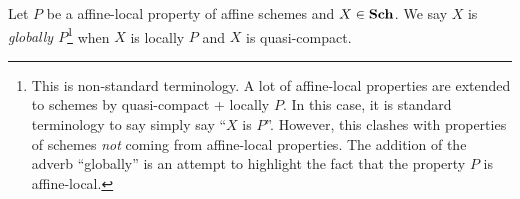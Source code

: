 \documentclass[../main.tex]{subfiles}
\begin{document}
\begin{dfn}[Globally]
  
  Let $P$ be a affine-local property of affine schemes and 
  $X \in \mathbf{Sch}$.
  We say $X$ is \emph{globally $P$}\footnote{
    This is non-standard terminology.
    A lot of affine-local properties are extended to schemes by 
    quasi-compact + locally $P$.
    In this case, it is standard terminology to say simply say
    ``$X$ is $P$''.
    However, this clashes with properties of schemes
    \emph{not} coming from affine-local properties.
    The addition of the adverb ``globally'' is an attempt to 
    highlight the fact that the property $P$ is affine-local.
  } when 
  $X$ is locally $P$ and $X$ is quasi-compact.
\end{dfn}
\end{document}
